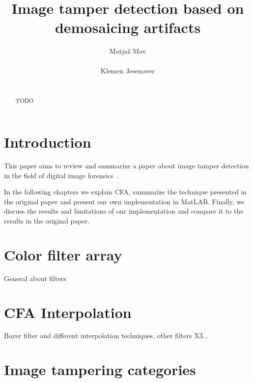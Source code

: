 \documentclass{template/acm_proc_article-sp}
\begin{document}
 

\title{Image tamper detection based on demosaicing artifacts}

\author{
\alignauthor
Matjaž Mav\\
       \\
\alignauthor
Klemen Jesenovec\\
       \\
}

\maketitle
\begin{abstract}
TODO
\end{abstract}


\section{Introduction}
This paper aims to review and summarize a paper about image tamper 
detection in the field of digital image forensics~\cite{dirik2009image}.



In the following chapters we explain CFA, summarize the technique presented 
in the original paper and present our own implementation in MatLAB.
Finally, we discuss the results and limitations of our implementation and compare it
to the results in the original paper.

\section{Color filter array}
General about filters

\section{CFA Interpolation}
Bayer filter and different interpolation techniques, other filters X3...

\section{Image tampering categories}
\end{document}
